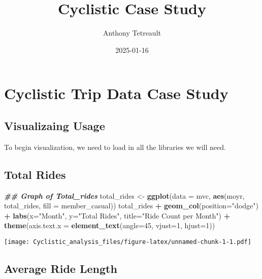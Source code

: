 \documentclass[
]{article}
\title{Cyclistic Case Study}
\author{Anthony Tetreault}
\date{2025-01-16}
\newenvironment{Shaded}{\begin{snugshade}}{\end{snugshade}}
\newcommand{\AttributeTok}[1]{\textcolor[rgb]{0.13,0.29,0.53}{#1}}
\newcommand{\DecValTok}[1]{\textcolor[rgb]{0.00,0.00,0.81}{#1}}
\newcommand{\DocumentationTok}[1]{\textcolor[rgb]{0.56,0.35,0.01}{\textbf{\textit{#1}}}}
\newcommand{\FunctionTok}[1]{\textcolor[rgb]{0.13,0.29,0.53}{\textbf{#1}}}
\newcommand{\NormalTok}[1]{#1}
\newcommand{\OtherTok}[1]{\textcolor[rgb]{0.56,0.35,0.01}{#1}}
\newcommand{\SpecialCharTok}[1]{\textcolor[rgb]{0.81,0.36,0.00}{\textbf{#1}}}
\newcommand{\StringTok}[1]{\textcolor[rgb]{0.31,0.60,0.02}{#1}}
\begin{document}
\maketitle

\section{Cyclistic Trip Data Case
Study}\label{cyclistic-trip-data-case-study}

\subsection{Visualizaing Usage}\label{visualizaing-usage}

To begin visualization, we need to load in all the libraries we will
need.

\subsection{Total Rides}\label{total-rides}

\begin{Shaded}
\begin{Highlighting}[]
\DocumentationTok{\#\# Graph of Total\_rides}
\NormalTok{total\_rides }\OtherTok{\textless{}{-}} \FunctionTok{ggplot}\NormalTok{(}\AttributeTok{data =}\NormalTok{ mvc, }\FunctionTok{aes}\NormalTok{(moyr, total\_rides, }\AttributeTok{fill =}\NormalTok{ member\_casual))}
\NormalTok{total\_rides }\SpecialCharTok{+} \FunctionTok{geom\_col}\NormalTok{(}\AttributeTok{position=}\StringTok{"dodge"}\NormalTok{) }\SpecialCharTok{+} 
  \FunctionTok{labs}\NormalTok{(}\AttributeTok{x=}\StringTok{"Month"}\NormalTok{, }\AttributeTok{y=}\StringTok{"Total Rides"}\NormalTok{, }\AttributeTok{title=}\StringTok{"Ride Count per Month"}\NormalTok{) }\SpecialCharTok{+}
  \FunctionTok{theme}\NormalTok{(}\AttributeTok{axis.text.x =} \FunctionTok{element\_text}\NormalTok{(}\AttributeTok{angle=}\DecValTok{45}\NormalTok{, }\AttributeTok{vjust=}\DecValTok{1}\NormalTok{, }\AttributeTok{hjust=}\DecValTok{1}\NormalTok{))}
\end{Highlighting}
\end{Shaded}

\texttt{[image: Cyclistic\_analysis\_files/figure-latex/unnamed-chunk-1-1.pdf]}

\subsection{Average Ride Length}\label{average-ride-length}
\end{document}

